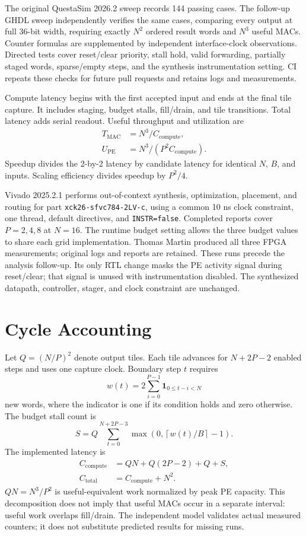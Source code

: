 \documentclass[conference]{IEEEtran}
\begin{document}
The original QuestaSim 2026.2 sweep records 144 passing cases. The follow-up GHDL sweep independently verifies the same cases, comparing every output at full 36-bit width, requiring exactly $N^2$ ordered result words and $N^3$ useful MACs. Counter formulas are supplemented by independent interface-clock observations. Directed tests cover reset/clear priority, stall hold, valid forwarding, partially staged words, sparse/empty steps, and the synthesis instrumentation setting. CI repeats these checks for future pull requests and retains logs and measurements.

Compute latency begins with the first accepted input and ends at the final tile capture. It includes staging, budget stalls, fill/drain, and tile transitions. Total latency adds serial readout. Useful throughput and utilization are
\begin{align}
 T_{\mathrm{MAC}} &= N^3/C_{\mathrm{compute}},\\
 U_{\mathrm{PE}} &= N^3/(P^2 C_{\mathrm{compute}}).
\end{align}
Speedup divides the 2-by-2 latency by candidate latency for identical $N$, $B$, and inputs. Scaling efficiency divides speedup by $P^2/4$.

Vivado 2025.2.1 performs out-of-context synthesis, optimization, placement, and routing for part \texttt{xck26-sfvc784-2LV-c}, using a common 10 ns clock constraint, one thread, default directives, and \texttt{INSTR=false}. Completed reports cover $P=2,4,8$ at $N=16$. The runtime budget setting allows the three budget values to share each grid implementation. Thomas Martin produced all three FPGA measurements; original logs and reports are retained. These runs precede the analysis follow-up. Its only RTL change masks the PE activity signal during reset/clear; that signal is unused with instrumentation disabled. The synthesized datapath, controller, stager, and clock constraint are unchanged.

\section{Cycle Accounting}
Let $Q=(N/P)^2$ denote output tiles. Each tile advances for $N+2P-2$ enabled steps and uses one capture clock. Boundary step $t$ requires
\begin{equation}
w(t)=2\sum_{i=0}^{P-1}\mathbf{1}_{0\leq t-i<N}
\end{equation}
new words, where the indicator is one if its condition holds and zero otherwise. The budget stall count is
\begin{equation}
 S=Q\sum_{t=0}^{N+2P-3}\max\left(0,\left\lceil w(t)/B\right\rceil-1\right).
\end{equation}
The implemented latency is
\begin{align}
 C_{\mathrm{compute}} &= QN+Q(2P-2)+Q+S,\\
 C_{\mathrm{total}} &= C_{\mathrm{compute}}+N^2.
\end{align}
$QN=N^3/P^2$ is useful-equivalent work normalized by peak PE capacity. This decomposition does not imply that useful MACs occur in a separate interval: useful work overlaps fill/drain. The independent model validates actual measured counters; it does not substitute predicted results for missing runs.
\end{document}
